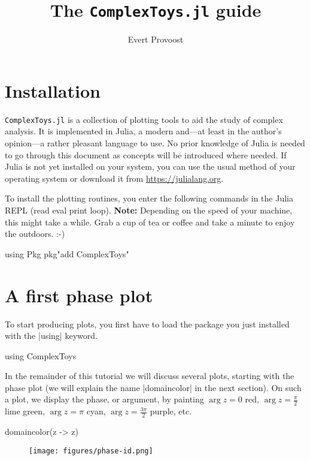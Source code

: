 \documentclass[a4paper]{article}
\title{\vspace*{-1em}The \texttt{ComplexToys.jl} guide}
\author{Evert Provoost}
\date{}
\begin{document}
\maketitle

\section{Installation}

\texttt{ComplexToys.jl} is a collection of
plotting tools to aid the study of complex analysis. It is implemented in Julia,
a modern and---at least in the author's opinion---a rather pleasant language to
use.  No prior knowledge of Julia is needed to go through this document as
concepts will be introduced where needed. If Julia is not yet installed on your
system, you can use the usual method of your operating system or download it
from \url{https://julialang.org}.

To install the plotting routines, you enter the following commands in the Julia
REPL (read eval print loop).  \textbf{Note:} Depending on the speed of your
machine, this might take a while. Grab a cup of tea or coffee and take a minute
to enjoy the outdoors. :-)

\begin{juliaverbatim}
	using Pkg
	pkg"add ComplexToys"
\end{juliaverbatim}

\section{A first phase plot}

To start producing plots, you first have to load the package you just installed
with the \jlv|using| keyword.

\begin{juliaverbatim}
	using ComplexToys
\end{juliaverbatim}

In the remainder of this tutorial we will discuss several plots, starting with
the phase plot (we will explain the name \jlv|domaincolor| in the next
section). On such a plot, we display the phase, or argument, by painting
$\arg z = 0$ red, $\arg z = \frac{\pi}{2}$ lime green, $\arg z = \pi$ cyan,
$\arg z = \frac{3\pi}{2}$ purple, etc.

\begin{juliaverbatim}
	domaincolor(z -> z)
\end{juliaverbatim}
\begin{figure}[H]
	\centering
	\texttt{[image: figures/phase-id.png]}
\end{figure}
\end{document}
